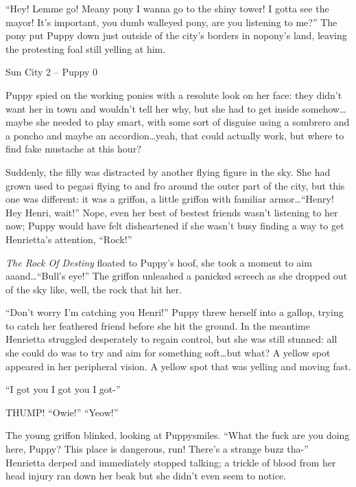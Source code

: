 ``Hey! Lemme go! Meany pony I wanna go to the shiny tower! I gotta see the mayor! It's important, you dumb walleyed pony, are you listening to me?'' The pony put Puppy down just outside of the city's borders in nopony's land, leaving the protesting foal still yelling at him.


\begin{center}
    Sun City 2 -- Puppy 0
\end{center}

\horizonline


Puppy spied on the working ponies with a resolute look on her face: they didn't want her in town and wouldn't tell her why, but she had to get inside somehow\dots maybe she needed to play smart, with some sort of disguise using a sombrero and a poncho and maybe an accordion\dots yeah, that could actually work, but where to find fake mustache at this hour?

Suddenly, the filly was distracted by another flying figure in the sky. She had grown used to pegasi flying to and fro around the outer part of the city, but this one was different: it was a griffon, a little griffon with familiar armor\dots ``Henry! Hey Henri, wait!'' Nope, even her best of bestest friends wasn't listening to her now; Puppy would have felt disheartened if she wasn't busy finding a way to get Henrietta's attention, ``Rock!''

\emph{The Rock Of Destiny} floated to Puppy's hoof, she took a moment to aim aaand\dots ``Bull's eye!'' The griffon unleashed a panicked screech as she dropped out of the sky like, well, the rock that hit her.

``Don't worry I'm catching you Henri!'' Puppy threw herself into a gallop, trying to catch her feathered friend before she hit the ground. In the meantime Henrietta struggled desperately to regain control, but she was still stunned: all she could do was to try and aim for something soft\dots but what? A yellow spot appeared in her peripheral vision. A yellow spot that was yelling and moving fast.

``I got you I got you I got-''

THUMP! ``Owie!'' ``Yeow!''

The young griffon blinked, looking at Puppysmiles. ``What the fuck are you doing here, Puppy? This place is dangerous, run! There's a strange buzz tha-'' Henrietta derped and immediately stopped talking; a trickle of blood from her head injury ran down her beak but she didn't even seem to notice.

